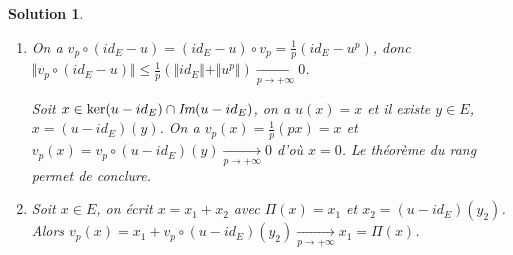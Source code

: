\documentclass[12pt]{article}
\newtheorem{solution}{Solution}[section]
\theoremstyle{remark}
\begin{document}
\begin{solution}
	\phantom{}
	\begin{enumerate}
		\item On a $v_{p}\circ(id_{E}-u)=(id_{E}-u)\circ v_{p}=\frac{1}{p}(id_{E}-u^{p})$, donc $\Vert v_{p}\circ(id_{E}-u)\Vert\leqslant\frac{1}{p}(\Vert id_{E}\Vert+\Vert u^{p}\Vert)\xrightarrow[p\to+\infty]{}0$.
		
		Soit $x\in\ker(u-id_{E})\cap\emph{Im}(u-id_{E})$, on a $u(x)=x$ et il existe $y\in E$, $x=(u-id_{E})(y)$. On a $v_{p}(x)=\frac{1}{p}(px)=x$ et $v_{p}(x)=v_{p}\circ(u-id_{E})(y)\xrightarrow[p\to+\infty]{}0$ d'où $x=0$. Le théorème du rang permet de conclure.

		\item Soit $x\in E$, on écrit $x=x_{1}+x_{2}$ avec $\Pi(x)=x_{1}$ et $x_{2}=(u-id_{E})(y_{2})$. Alors $v_{p}(x)=x_{1}+v_{p}\circ(u-id_{E})(y_{2})\xrightarrow[p\to+\infty]{}x_{1}=\Pi(x)$.
	\end{enumerate}
\end{solution}
\end{document}
